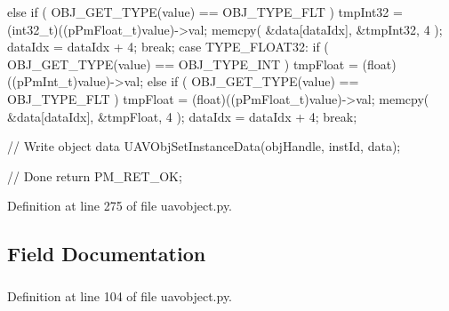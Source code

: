 \begin{DoxyVerb}
{{{{                }
                else if ( OBJ_GET_TYPE(value) == OBJ_TYPE_FLT )  
                {
                    tmpInt32 = (int32_t)((pPmFloat_t)value)->val;  
                } 						
                memcpy( &data[dataIdx], &tmpInt32, 4 );
                dataIdx = dataIdx + 4;
                break;  
        case TYPE_FLOAT32:
                if ( OBJ_GET_TYPE(value) == OBJ_TYPE_INT )  
                {
                        tmpFloat = (float)((pPmInt_t)value)->val;
                }
                else if ( OBJ_GET_TYPE(value) == OBJ_TYPE_FLT )  
                {
                    tmpFloat = (float)((pPmFloat_t)value)->val;  
                } 						
                memcpy( &data[dataIdx], &tmpFloat, 4 );
                dataIdx = dataIdx + 4;
                break;    
}
        }
}

// Write object data
UAVObjSetInstanceData(objHandle, instId, data);

// Done
return PM_RET_OK;
\end{DoxyVerb}
 

\-Definition at line 275 of file uavobject.\-py.



\subsection{\-Field \-Documentation}
\hypertarget{classuavobject_1_1_u_a_v_object_af9ce81de37f806ae8b2b50bfa9e6c72b}{
\subsubsection[{fields}]{}}\label{classuavobject_1_1_u_a_v_object_af9ce81de37f806ae8b2b50bfa9e6c72b}


\-Definition at line 104 of file uavobject.\-py.

\hypertarget{classuavobject_1_1_u_a_v_object_afb8864f141f2aca9fefa152fd64aeebe}{
\subsubsection[{inst\-Id}]{}}\label{classuavobject_1_1_u_a_v_object_afb8864f141f2aca9fefa152fd64aeebe}



